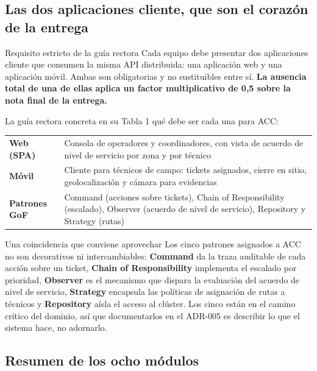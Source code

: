 \documentclass[11pt,a4paper]{article}
\begin{document}
\subsection{Las dos aplicaciones cliente, que son el corazón de la entrega}

\begin{pisoBox}{Requisito estricto de la guía rectora}
	Cada equipo debe presentar dos aplicaciones cliente que consumen la misma API distribuida: una aplicación web y una aplicación móvil. Ambas son obligatorias y no sustituibles entre sí. \textbf{La ausencia total de una de ellas aplica un factor multiplicativo de 0,5 sobre la nota final de la entrega.}
\end{pisoBox}

La guía rectora concreta en su Tabla 1 qué debe ser cada una para ACC:

\begin{center}
	\small
	\begin{tabular}{@{}p{2.5cm}p{12.5cm}@{}}
		\toprule
		\textbf{Web (SPA)} & Consola de operadores y coordinadores, con vista de acuerdo de nivel de servicio por zona y por técnico \\
		\addlinespace
		\textbf{Móvil} & Cliente para técnicos de campo: tickets asignados, cierre en sitio, geolocalización y cámara para evidencias \\
		\addlinespace
		\textbf{Patrones GoF} & Command (acciones sobre tickets), Chain of Responsibility (escalado), Observer (acuerdo de nivel de servicio), Repository y Strategy (rutas) \\
		\bottomrule
	\end{tabular}
\end{center}

\begin{defBox}{Una coincidencia que conviene aprovechar}
	Los cinco patrones asignados a ACC no son decorativos ni intercambiables: \textbf{Command} da la traza auditable de cada acción sobre un ticket, \textbf{Chain of Responsibility} implementa el escalado por prioridad, \textbf{Observer} es el mecanismo que dispara la evaluación del acuerdo de nivel de servicio, \textbf{Strategy} encapsula las políticas de asignación de rutas a técnicos y \textbf{Repository} aísla el acceso al clúster. Los cinco están en el camino crítico del dominio, así que documentarlos en el ADR-005 es describir lo que el sistema hace, no adornarlo.
\end{defBox}

\subsection{Resumen de los ocho módulos}
\end{document}
